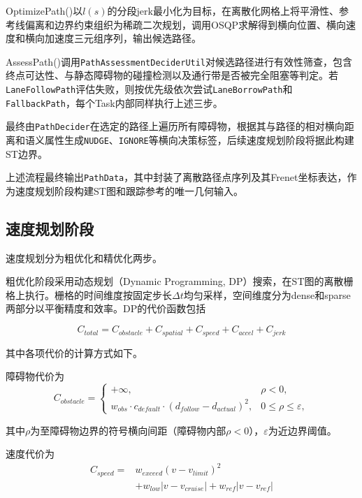 OptimizePath()以$l(s)$的分段jerk最小化为目标，在离散化网格上将平滑性、参考线偏离和边界约束组织为稀疏二次规划，调用OSQP求解得到横向位置、横向速度和横向加速度三元组序列，输出候选路径。

AssessPath()调用\texttt{PathAssessmentDeciderUtil}对候选路径进行有效性筛查，包含终点可达性、与静态障碍物的碰撞检测以及通行带是否被完全阻塞等判定。若\texttt{LaneFollowPath}评估失败，则按优先级依次尝试\texttt{LaneBorrowPath}和\texttt{FallbackPath}，每个Task内部同样执行上述三步。

最终由\texttt{PathDecider}在选定的路径上遍历所有障碍物，根据其与路径的相对横向距离和语义属性生成\texttt{NUDGE}、\texttt{IGNORE}等横向决策标签，后续速度规划阶段将据此构建ST边界。

上述流程最终输出\texttt{PathData}，其中封装了离散路径点序列及其Frenet坐标表达，作为速度规划阶段构建ST图和跟踪参考的唯一几何输入。

\subsection{速度规划阶段}

速度规划分为粗优化和精优化两步。

粗优化阶段采用动态规划（Dynamic Programming, DP）搜索，在ST图的离散栅格上执行。栅格的时间维度按固定步长$\Delta t$均匀采样，空间维度分为dense和sparse两部分以平衡精度和效率。DP的代价函数包括

\begin{equation}
C_{total} = C_{obstacle} + C_{spatial} + C_{speed} + C_{accel} + C_{jerk}
\label{eq:dp_cost}
\end{equation}

其中各项代价的计算方式如下。

障碍物代价为
\begin{equation}
C_{obstacle} = \begin{cases}
+\infty, & \rho < 0, \\
w_{obs} \cdot c_{default} \cdot (d_{follow} - d_{actual})^2, & 0 \le \rho \le \varepsilon,
\end{cases}
\end{equation}

其中$\rho$为至障碍物边界的符号横向间距（障碍物内部$\rho<0$），$\varepsilon$为近边界阈值。

速度代价为
\begin{equation}
\begin{aligned}
C_{speed} = {}& w_{exceed}(v - v_{limit})^2 \\
&+ w_{low}|v - v_{cruise}| + w_{ref}|v - v_{ref}|
\end{aligned}
\end{equation}

